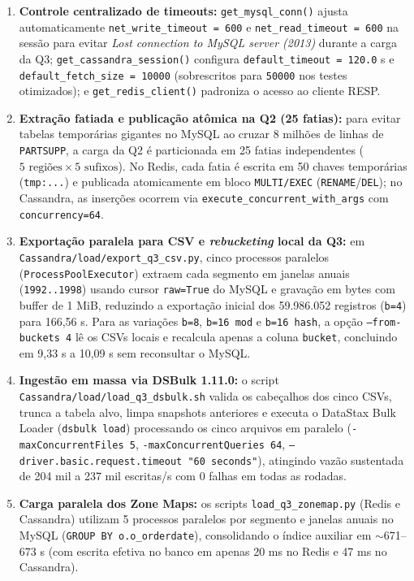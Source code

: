 \documentclass[12pt,a4paper]{article}
\begin{document}
\begin{enumerate}
    \item \textbf{Controle centralizado de timeouts:} \texttt{get\_mysql\_conn()} ajusta automaticamente \texttt{net\_write\_timeout = 600} e \texttt{net\_read\_timeout = 600} na sessão para evitar \textit{Lost connection to MySQL server (2013)} durante a carga da Q3; \texttt{get\_cassandra\_session()} configura \texttt{default\_timeout = 120.0} s e \texttt{default\_fetch\_size = 10000} (sobrescritos para \texttt{50000} nos testes otimizados); e \texttt{get\_redis\_client()} padroniza o acesso ao cliente RESP.
    \item \textbf{Extração fatiada e publicação atômica na Q2 (25 fatias):} para evitar tabelas temporárias gigantes no MySQL ao cruzar 8 milhões de linhas de \texttt{PARTSUPP}, a carga da Q2 é particionada em 25 fatias independentes ($5 \text{ regiões} \times 5 \text{ sufixos}$). No Redis, cada fatia é escrita em 50 chaves temporárias (\texttt{tmp:...}) e publicada atomicamente em bloco \texttt{MULTI/EXEC} (\texttt{RENAME}/\texttt{DEL}); no Cassandra, as inserções ocorrem via \texttt{execute\_concurrent\_with\_args} com \texttt{concurrency=64}.
    \item \textbf{Exportação paralela para CSV e \textit{rebucketing} local da Q3:} em \texttt{Cassandra/load/export\_q3\_csv.py}, cinco processos paralelos (\texttt{ProcessPoolExecutor}) extraem cada segmento em janelas anuais (\texttt{1992..1998}) usando cursor \texttt{raw=True} do MySQL e gravação em bytes com buffer de 1 MiB, reduzindo a exportação inicial dos 59.986.052 registros (\texttt{b=4}) para 166,56 s. Para as variações \texttt{b=8}, \texttt{b=16 mod} e \texttt{b=16 hash}, a opção \texttt{--from-buckets 4} lê os CSVs locais e recalcula apenas a coluna \texttt{bucket}, concluindo em 9,33 s a 10,09 s sem reconsultar o MySQL.
    \item \textbf{Ingestão em massa via DSBulk 1.11.0:} o script \texttt{Cassandra/load/load\_q3\_dsbulk.sh} valida os cabeçalhos dos cinco CSVs, trunca a tabela alvo, limpa snapshots anteriores e executa o DataStax Bulk Loader (\texttt{dsbulk load}) processando os cinco arquivos em paralelo (\texttt{-maxConcurrentFiles 5}, \texttt{-maxConcurrentQueries 64}, \texttt{--driver.basic.request.timeout "60 seconds"}), atingindo vazão sustentada de 204 mil a 237 mil escritas/s com 0 falhas em todas as rodadas.
    \item \textbf{Carga paralela dos Zone Maps:} os scripts \texttt{load\_q3\_zonemap.py} (Redis e Cassandra) utilizam 5 processos paralelos por segmento e janelas anuais no MySQL (\texttt{GROUP BY o.o\_orderdate}), consolidando o índice auxiliar em $\sim$671--673 s (com escrita efetiva no banco em apenas 20 ms no Redis e 47 ms no Cassandra).
\end{enumerate}
\end{document}
